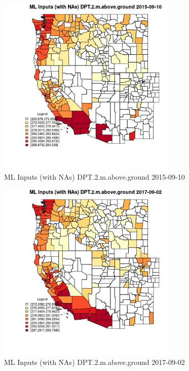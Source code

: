 \begin{figure} 
\centering  
\includegraphics[width=0.77\textwidth]{Code_Outputs/Report_ML_input_PM25_Step4_part_e_de_duplicated_aves_compiled_2019-05-20wNAs_CountyDPT2mabovegroundMean2015-09-10.jpg} 
\caption{\label{fig:Report_ML_input_PM25_Step4_part_e_de_duplicated_aves_compiled_2019-05-20wNAsCountyDPT2mabovegroundMean2015-09-10}ML Inputs (with NAs) DPT.2.m.above.ground 2015-09-10} 
\end{figure} 
 

\begin{figure} 
\centering  
\includegraphics[width=0.77\textwidth]{Code_Outputs/Report_ML_input_PM25_Step4_part_e_de_duplicated_aves_compiled_2019-05-20wNAs_CountyDPT2mabovegroundMean2017-09-02.jpg} 
\caption{\label{fig:Report_ML_input_PM25_Step4_part_e_de_duplicated_aves_compiled_2019-05-20wNAsCountyDPT2mabovegroundMean2017-09-02}ML Inputs (with NAs) DPT.2.m.above.ground 2017-09-02} 
\end{figure} 
 

